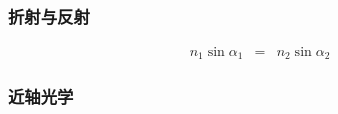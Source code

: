 \documentclass{beamer}
\begin{document}
{{{{\begin{frame}
  \
  
  {\hspace{4em}}
\end{frame}}{\begin{frame}
  \frametitle{折射与反射}
  
  \begin{eqnarray*}
    n_1 \sin \alpha_1 & = & n_2 \sin \alpha_2
  \end{eqnarray*}
\end{frame}}{\begin{frame}
  \frametitle{近轴光学}
  
  \
  
\end{frame}}{\begin{frame}
  \frametitle{}
  

\end{frame}}}}}
\end{document}
